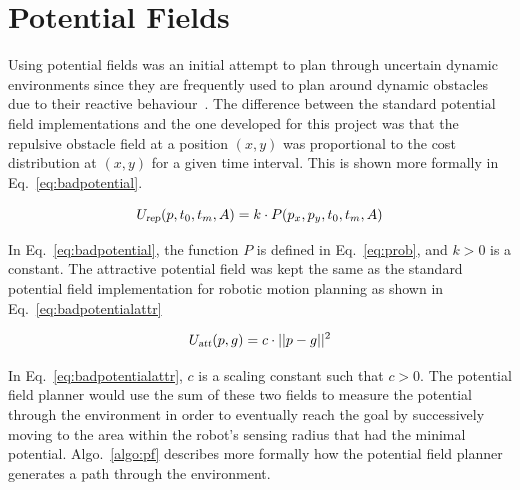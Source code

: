 \section{Potential Fields}

\label{sec:costpf}

Using potential fields was an initial attempt to plan through uncertain dynamic
environments since they are frequently used to plan around dynamic obstacles
due to their reactive behaviour~\cite{pf, wallar_taros_2013,
wallar_ssci_2014_boids}.  The difference between the standard potential field
implementations and the one developed for this project was that the repulsive
obstacle field at a position $(x, y)$ was proportional to the cost distribution
at $(x, y)$ for a given time interval.  This is shown more formally in
Eq.~\ref{eq:badpotential}.

\begin{equation}
    U_{\Var{rep}}(p, t_0, t_m, A) = k \cdot P(p_x, p_y, t_0, t_m, A)
    \label{eq:badpotential}
\end{equation}

In Eq.~\ref{eq:badpotential}, the function $P$ is defined in Eq.~\ref{eq:prob},
and $k > 0$ is a constant.  The attractive potential field was kept the same as
the standard potential field implementation for robotic motion planning as
shown in Eq.~\ref{eq:badpotentialattr}

\begin{equation}
    U_{\Var{att}}(p, g) = c \cdot ||p - g||^2
    \label{eq:badpotentialattr}
\end{equation}

In Eq.~\ref{eq:badpotentialattr}, $c$ is a scaling constant such that $c > 0$.
The potential field planner would use the sum of these two fields to measure
the potential through the environment in order to eventually reach the goal by
successively moving to the area within the robot's sensing radius that had the
minimal potential.  Algo.~\ref{algo:pf} describes more formally how the
potential field planner generates a path through the environment.

